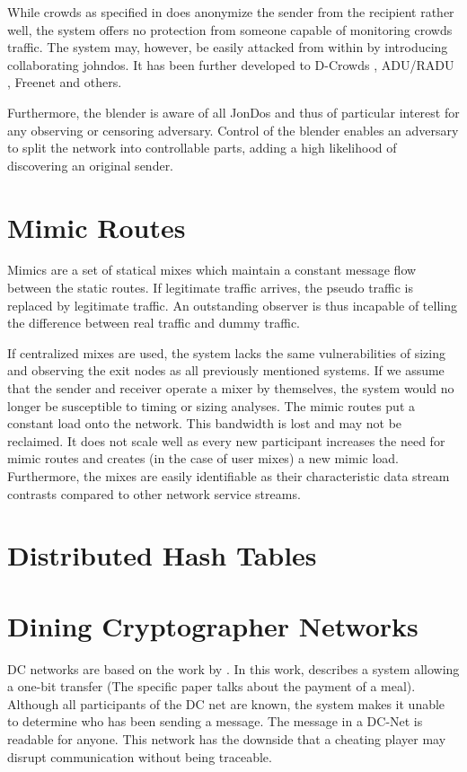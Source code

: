 While crowds as specified in \cite{crowds:tissec} does anonymize the sender from the recipient rather well, the system offers no protection from someone capable of monitoring crowds traffic. The system may, however, be easily attacked from within by introducing collaborating johndos. It has been further developed to D-Crowds \cite{crowdsAttack}, ADU/RADU \cite{Munoz-Gea2008}, Freenet\cite{freenet} and others. 

Furthermore, the blender is aware of all JonDos and thus of particular interest for any observing or censoring adversary. Control of the blender enables an adversary to split the network into controllable parts, adding a high likelihood of discovering an original sender.

\section{Mimic Routes}
Mimics are a set of statical mixes which maintain a constant message flow between the static routes. If legitimate traffic arrives, the pseudo traffic is replaced by legitimate traffic. An outstanding observer is thus incapable of telling the difference between real traffic and dummy traffic.

If centralized mixes are used, the system lacks the same vulnerabilities of sizing and observing the exit nodes as all previously mentioned systems. If we assume that the sender and receiver operate a mixer by themselves, the system would no longer be susceptible to timing or sizing analyses. The mimic routes put a constant load onto the network. This bandwidth is lost and may not be reclaimed. It does not scale well as every new participant increases the need for mimic routes and creates (in the case of user mixes) a new mimic load. Furthermore, the mixes are easily identifiable as their characteristic data stream contrasts compared to other network service streams.

\section{Distributed Hash Tables}

\section{Dining Cryptographer Networks}
DC networks are based on the work  by \citeauthor{chaum-dc}\cite{chaum-dc}. In this work, \citeauthor{chaum-dc} describes a system allowing a one-bit transfer (The specific paper talks about the payment of a meal). Although all participants of the DC net are known, the system makes it unable to determine who has been sending a message. The message in a DC-Net is readable for anyone. This network has the downside that a cheating player may disrupt communication without being traceable.

